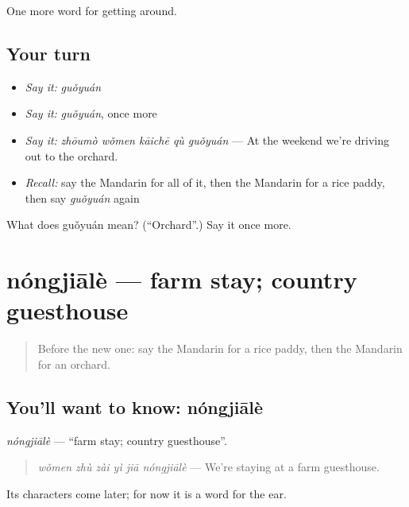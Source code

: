 \begin{grammarlens}[title={What you've built}]
One more word for getting around.
\end{grammarlens}

\subsection*{Your turn}
\begin{itemize}
\raggedright
  \item \emph{Say it:} \emph{guǒyuán}
  \item \emph{Say it:} \emph{guǒyuán}, once more
  \item \emph{Say it:} \emph{zhōumò wǒmen kāichē qù guǒyuán} — At the weekend we're driving out to the orchard.
  \item \emph{Recall:} say the Mandarin for all of it, then the Mandarin for a rice paddy, then say \emph{guǒyuán} again
\end{itemize}

\begin{tcolorbox}[breakable,colback=teal!4,colframe=teal!35!black,title={Before you move on}]
What does guǒyuán mean? (\textquotedblleft{}Orchard\textquotedblright{}.) Say it once more.
\end{tcolorbox}
\section[nóngjiālè]{nóngjiālè — farm stay; country guesthouse}

\label{lesson:ZH-C439-nongjiale}



\begin{quote}
Before the new one: say the Mandarin for a rice paddy, then the Mandarin for an orchard.
\end{quote}

\subsection*{You'll want to know: nóngjiālè}
\emph{nóngjiālè} — \textquotedblleft{}farm stay; country guesthouse\textquotedblright{}.

\begin{quote}
\emph{wǒmen zhù zài yì jiā nóngjiālè} — We're staying at a farm guesthouse.
\end{quote}

Its characters come later; for now it is a word for the ear.

